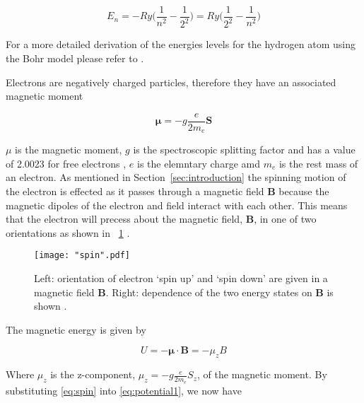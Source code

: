 \documentclass{article}
\newcommand{\figref}[2][\figurename~]{#1\ref{#2}}
\newcommand{\secref}[2][Section~]{#1\ref{#2}}
\begin{document}
\begin{equation}
\label{eq:balmer-series}
E_n = -Ry\Bigg(\frac{1}{n^2} - \frac{1}{2^2}\Bigg) = Ry\Bigg(\frac{1}{2^2} - \frac{1}{n^2}\Bigg)
\end{equation}

\vspace{2mm}
\noindent
For a more detailed derivation of the energies levels for the hydrogen atom using the Bohr model please refer to \cite{Book02}.

\vspace{2mm}
\noindent
Electrons are negatively charged particles, therefore they have an associated magnetic moment

\begin{equation}
\label{eq:magnetic-moment}
\boldsymbol{\mu} = -g\frac{e}{2m_e}\textbf{S}
\end{equation}

\vspace{2mm}
\noindent
\textbf{$\mu$} is the magnetic moment, $g$ is the spectroscopic splitting factor and has a value of 2.0023 for free electrons \cite{Paper02}, $e$ is the elemntary charge amd $m_e$ is the rest mass of an electron. As mentioned in \secref{sec:introduction} the spinning motion of the electron is effected as it passes through a magnetic field \textbf{B} because the magnetic dipoles of the electron and field interact with each other. This means that the electron will precess about the magnetic field, \textbf{B}, in one of two orientations as shown in \figref{fig:spin} \cite{Paper02}.

\begin{figure}[h]
\centering
\texttt{[image: "spin".pdf]}
\caption{Left: orientation of electron `spin up' and `spin down' are given in a magnetic field \textbf{B}. Right: dependence of the two energy states on \textbf{B} is shown \cite{Paper02}.}
\label{fig:spin}
\end{figure}

\newpage
\vspace{2mm}
\noindent
The magnetic energy is given by \cite{Paper02}

\begin{equation}
\label{eq:potential1}
U = -\boldsymbol{\mu} \cdot \textbf{B} = - \mu_zB
\end{equation}

\vspace{2mm}
\noindent
Where $\mu_z$ is the z-component, $\mu_z = -g\frac{e}{2m_e}S_z$, of the magnetic moment. By substituting \eqref{eq:spin} into \eqref{eq:potential1}, we now have
\end{document}

